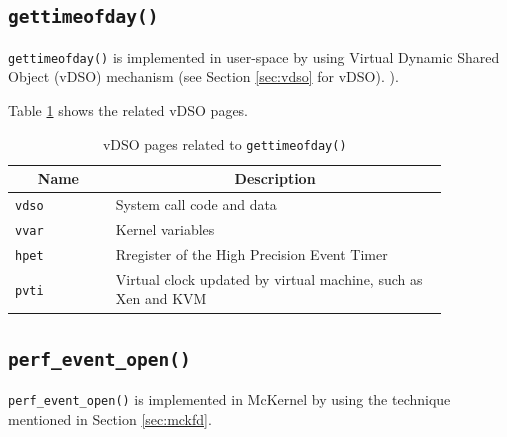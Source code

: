\documentclass[twoside,11pt,fleqn]{book}
\begin{document}
\subsection{\texttt{gettimeofday()}}
\texttt{gettimeofday()} is implemented in user-space by using Virtual Dynamic Shared Object (vDSO) mechanism (see Section \ref{sec:vdso} for vDSO).
).

Table \ref{tab:vdso_gettimeofday} shows the related vDSO pages.
\begin{table}[!ht]
\centering
\footnotesize
\caption{vDSO pages related to \texttt{gettimeofday()}}\vspace{0.0em}
\label{tab:vdso_gettimeofday}
\begin{tabular}{|p{0.20\linewidth}|p{0.66\linewidth}|} \hline
\multicolumn{1}{|c}{\textbf{Name}}&\multicolumn{1}{|c|}{\textbf{Description}}\\ \hline \hline
\texttt{vdso}&System call code and data\\ \hline
\texttt{vvar}&Kernel variables\\ \hline
\texttt{hpet}&Rregister of the High Precision Event Timer\\ \hline
\texttt{pvti}&Virtual clock updated by virtual machine, such as Xen and KVM\\ \hline 
\end{tabular}
\vspace{-0em}
\end{table}
\FloatBarrier

\subsection{\texttt{perf\_event\_open()}}
\texttt{perf\_event\_open()} is implemented in McKernel by using the technique mentioned in Section \ref{sec:mckfd}.
\end{document}
